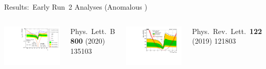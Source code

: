 \documentclass[11pt, xcolor={dvipsnames}, aspectratio=169, notes]{beamer}
\begin{document}

\begin{frame}{Results:\ Early Run~2 Analyses (Anomalous \allbold{\klambda})}
  \begin{columns}
    \centering\footnotesize

    \includegraphics[width=\textwidth]{status/atlas_36ifb_klambda}

    Phys.\ Lett.\ B \textbf{800} (2020) 135103

    \centering\footnotesize

    \includegraphics[width=\textwidth]{status/cms_36ifb_klambda}

    Phys.\ Rev.\ Lett.\ \textbf{122} (2019) 121803
  \end{columns}
\end{frame}
\end{document}
